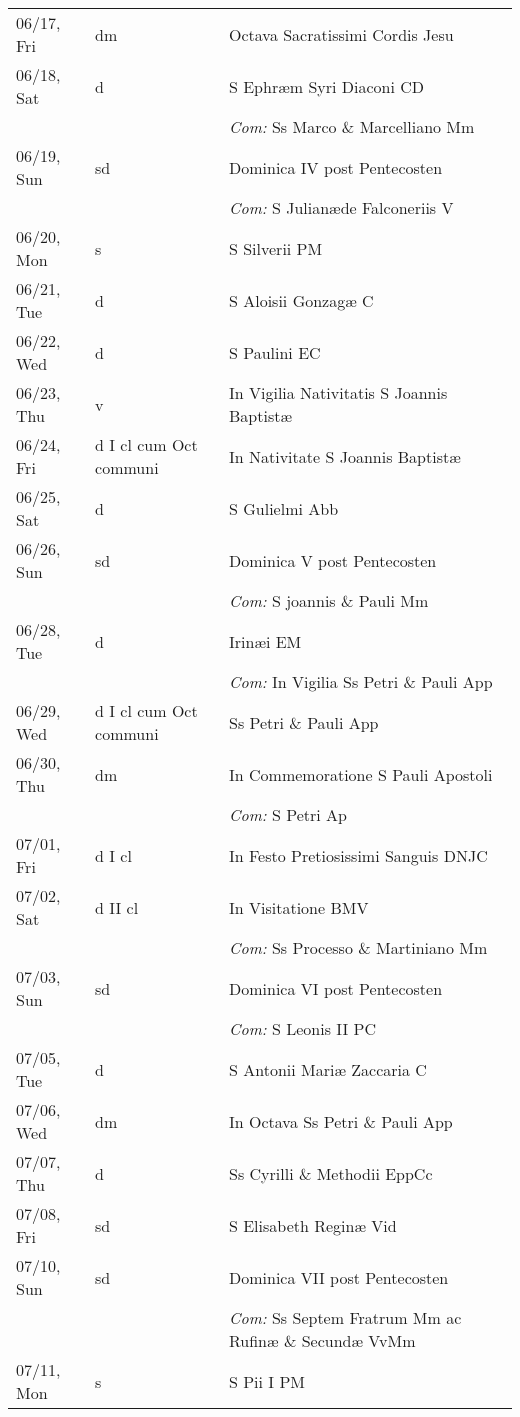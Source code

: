 \documentclass[10pt]{article}
\begin{document}
\begin{longtable}{ l l l }
06/17, Fri & dm & Octava Sacratissimi Cordis Jesu\\
06/18, Sat & d & S Ephræm Syri Diaconi CD\\
 & & \textit{Com:} Ss Marco \& Marcelliano Mm\\
06/19, Sun & sd & Dominica IV post Pentecosten\\
 & & \textit{Com:} S Julianæde Falconeriis V\\
06/20, Mon & s & S Silverii PM\\
06/21, Tue & d & S Aloisii Gonzagæ C\\
06/22, Wed & d & S Paulini EC\\
06/23, Thu & v & In Vigilia Nativitatis S Joannis Baptistæ\\
06/24, Fri & d I cl cum Oct communi & In Nativitate S Joannis Baptistæ\\
06/25, Sat & d & S Gulielmi Abb\\
06/26, Sun & sd & Dominica V post Pentecosten\\
 & & \textit{Com:} S joannis \& Pauli Mm\\
06/28, Tue & d & Irinæi EM\\
 & & \textit{Com:} In Vigilia Ss Petri \& Pauli App\\
06/29, Wed & d I cl cum Oct communi & Ss Petri \& Pauli App\\
06/30, Thu & dm & In Commemoratione S Pauli Apostoli\\
 & & \textit{Com:} S Petri Ap\\
07/01, Fri & d I cl & In Festo Pretiosissimi Sanguis DNJC\\
07/02, Sat & d II cl & In Visitatione BMV\\
 & & \textit{Com:} Ss Processo \& Martiniano Mm\\
07/03, Sun & sd & Dominica VI post Pentecosten\\
 & & \textit{Com:} S Leonis II PC\\
07/05, Tue & d & S Antonii Mariæ Zaccaria C\\
07/06, Wed & dm & In Octava Ss Petri \& Pauli App\\
07/07, Thu & d & Ss Cyrilli \& Methodii EppCc\\
07/08, Fri & sd & S Elisabeth Reginæ Vid\\
07/10, Sun & sd & Dominica VII post Pentecosten\\
 & & \textit{Com:} Ss Septem Fratrum Mm ac Rufinæ \& Secundæ VvMm\\
07/11, Mon & s & S Pii I PM\\

\end{longtable}
\end{document}
